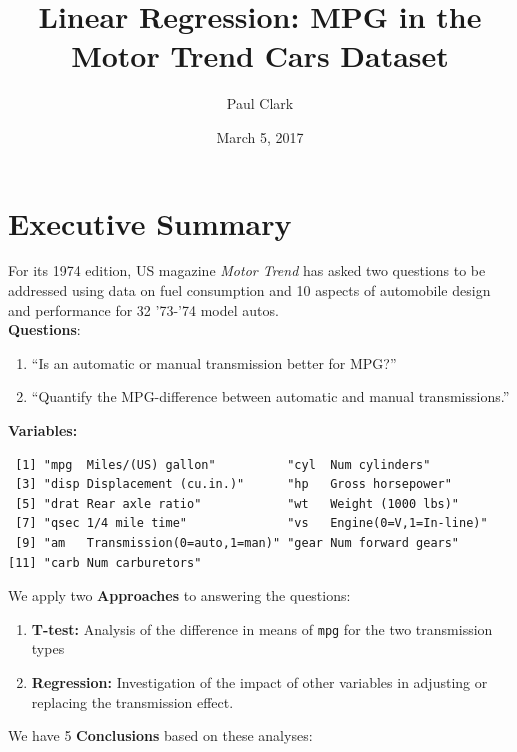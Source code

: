 \documentclass[]{article}
\title{Linear Regression: MPG in the Motor Trend Cars Dataset}
\author{Paul Clark}
\date{March 5, 2017}
\providecommand{\tightlist}{%
  \setlength{\itemsep}{0pt}\setlength{\parskip}{0pt}}
\begin{document}
\maketitle

\section{Executive Summary}\label{executive-summary}

For its 1974 edition, US magazine \emph{Motor Trend} has asked two
questions to be addressed using data on fuel consumption and 10 aspects
of automobile design and performance for 32 '73-'74 model autos.\\
\textbf{Questions}:

\begin{enumerate}
\def\labelenumi{\arabic{enumi}.}
\tightlist
\item
  ``Is an automatic or manual transmission better for MPG?''
\item
  ``Quantify the MPG-difference between automatic and manual
  transmissions.''
\end{enumerate}

\textbf{Variables:}

\begin{verbatim}
 [1] "mpg  Miles/(US) gallon"          "cyl  Num cylinders"             
 [3] "disp Displacement (cu.in.)"      "hp   Gross horsepower"          
 [5] "drat Rear axle ratio"            "wt   Weight (1000 lbs)"         
 [7] "qsec 1/4 mile time"              "vs   Engine(0=V,1=In-line)"     
 [9] "am   Transmission(0=auto,1=man)" "gear Num forward gears"         
[11] "carb Num carburetors"           
\end{verbatim}

We apply two \textbf{Approaches} to answering the questions:

\begin{enumerate}
\def\labelenumi{(\Alph{enumi})}
\tightlist
\item
  \textbf{T-test:} Analysis of the difference in means of \texttt{mpg}
  for the two transmission types
\item
  \textbf{Regression:} Investigation of the impact of other variables in
  adjusting or replacing the transmission effect.
\end{enumerate}

We have 5 \textbf{Conclusions} based on these analyses:
\end{document}
